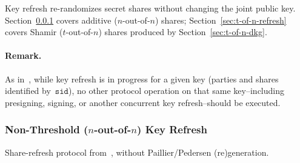 \documentclass[11pt]{article}
\newcommand{\sid}{\ensuremath{\mathtt{sid}}}
\newcommand{\?}[1]{\stackrel{?}{#1}}
\begin{document}
Key refresh re-randomizes secret shares without changing the joint public key.
Section~\ref{sec:n-of-n-refresh} covers additive ($n$-out-of-$n$) shares; Section~\ref{sec:t-of-n-refresh} covers Shamir ($t$-out-of-$n$) shares produced by Section~\ref{sec:t-of-n-dkg}.
\paragraph{Remark.}
As in~\cite[Remark~4.1]{cggmp24}, while key refresh is in progress for a given key (parties and shares identified by~$\sid$), no other protocol operation on that same key--including presigning, signing, or another concurrent key refresh--should be executed.

\subsubsection{Non-Threshold ($n$-out-of-$n$) Key Refresh}
\label{sec:n-of-n-refresh}

Share-refresh protocol from~\cite[Figure~7]{cggmp24}, without Paillier/Pedersen (re)generation.
\end{document}
